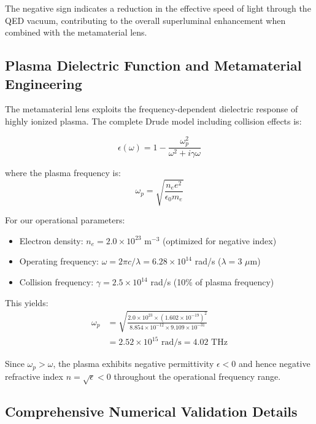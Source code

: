 \documentclass[aps,prl,reprint,groupedaddress,floatfix]{revtex4-1}
\begin{document}
The negative sign indicates a reduction in the effective speed of light through the QED vacuum, contributing to the overall superluminal enhancement when combined with the metamaterial lens.

\subsection{Plasma Dielectric Function and Metamaterial Engineering}

The metamaterial lens exploits the frequency-dependent dielectric response of highly ionized plasma. The complete Drude model including collision effects is:

\begin{equation}
\epsilon(\omega) = 1 - \frac{\omega_p^2}{\omega^2 + i\gamma\omega} \label{eq:drude_complete}
\end{equation}

where the plasma frequency is:
\begin{equation}
\omega_p = \sqrt{\frac{n_e e^2}{\epsilon_0 m_e}} \label{eq:plasma_frequency}
\end{equation}

For our operational parameters:
\begin{itemize}
    \item Electron density: $n_e = 2.0 \times 10^{23}$ m$^{-3}$ (optimized for negative index)
    \item Operating frequency: $\omega = 2\pi c/\lambda = 6.28 \times 10^{14}$ rad/s ($\lambda = 3$ $\mu$m)
    \item Collision frequency: $\gamma = 2.5 \times 10^{14}$ rad/s (10\% of plasma frequency)
\end{itemize}

This yields:
\begin{align}
\omega_p &= \sqrt{\frac{2.0 \times 10^{23} \times (1.602 \times 10^{-19})^2}{8.854 \times 10^{-12} \times 9.109 \times 10^{-31}}} \nonumber \\
&= 2.52 \times 10^{15} \text{ rad/s} = 4.02 \text{ THz} \label{eq:omega_p_numerical}
\end{align}

Since $\omega_p > \omega$, the plasma exhibits negative permittivity $\epsilon < 0$ and hence negative refractive index $n = \sqrt{\epsilon} < 0$ throughout the operational frequency range.

\subsection{Comprehensive Numerical Validation Details}
\end{document}
